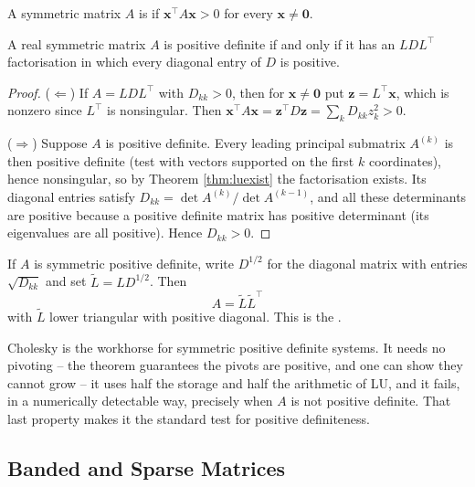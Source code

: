 \begin{definition}
  A symmetric matrix $A$ is  if $\mathbf{x}^\top A\mathbf{x} > 0$ for every $\mathbf{x}\neq \mathbf{0}$.
\end{definition}

\begin{theorem}\label{thm:posdef}
  A real symmetric matrix $A$ is positive definite if and only if it has an $LDL^\top$ factorisation in which every diagonal entry of $D$ is positive.
\end{theorem}
\begin{proof}
  ($\Leftarrow$) If $A = LDL^\top$ with $D_{kk} > 0$, then for $\mathbf{x}\neq\mathbf{0}$ put $\mathbf{z} = L^\top\mathbf{x}$, which is nonzero since $L^\top$ is nonsingular. Then $\mathbf{x}^\top A\mathbf{x} = \mathbf{z}^\top D\mathbf{z} = \sum_k D_{kk}z_k^2 > 0$.

  ($\Rightarrow$) Suppose $A$ is positive definite. Every leading principal submatrix $A^{(k)}$ is then positive definite (test with vectors supported on the first $k$ coordinates), hence nonsingular, so by Theorem \ref{thm:luexist} the factorisation exists. Its diagonal entries satisfy $D_{kk} = \det A^{(k)}/\det A^{(k-1)}$, and all these determinants are positive because a positive definite matrix has positive determinant (its eigenvalues are all positive). Hence $D_{kk} > 0$.
\end{proof}

\begin{definition}
  If $A$ is symmetric positive definite, write $D^{1/2}$ for the diagonal matrix with entries $\sqrt{D_{kk}}$ and set $\tilde L = LD^{1/2}$. Then
  $$
  A = \tilde L\tilde L^\top
  $$
  with $\tilde L$ lower triangular with positive diagonal. This is the .
\end{definition}

Cholesky is the workhorse for symmetric positive definite systems. It needs no pivoting -- the theorem guarantees the pivots are positive, and one can show they cannot grow -- it uses half the storage and half the arithmetic of LU, and it fails, in a numerically detectable way, precisely when $A$ is not positive definite. That last property makes it the standard test for positive definiteness.

\subsection{Banded and Sparse Matrices}

